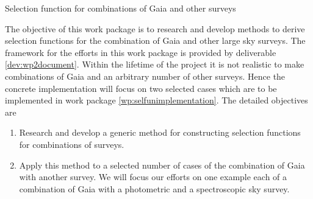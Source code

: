 \begin{workpackage}{Selection function for combinations of Gaia and other surveys}
  \label{wp:selfuncombine}
  \wpend{\duration} %

  \makewptable %

  \begin{wpobjectives}
    The objective of this work package is to research and develop methods to derive selection functions for the combination of Gaia and other large sky surveys. The framework for the efforts in this work package is provided by deliverable \ref{dev:wp2document}. Within the lifetime of the project it is not realistic to make combinations of Gaia and an arbitrary number of other surveys. Hence the concrete implementation will focus on two selected cases which are to be implemented in work package \ref{wp:selfunimplementation}. The detailed objectives are
    \begin{enumerate}
      \item Research and develop a generic method for constructing selection functions for combinations of surveys.
      \item Apply this method to a selected number of cases of the combination of Gaia with another survey. We will focus our efforts on one example each of a combination of Gaia with a photometric and a spectroscopic sky survey.
    \end{enumerate}
  \end{wpobjectives}

  \begin{wpdescription}
\end{wpdescription}
\end{workpackage}
